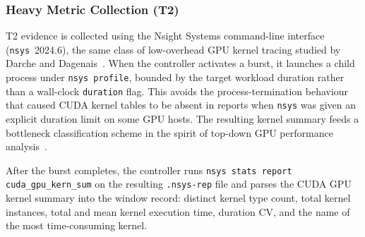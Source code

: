 \subsubsection{Heavy Metric Collection (T2)}

T2 evidence is collected using the Nsight Systems command-line interface (\texttt{nsys}~2024.6), the same class of low-overhead GPU kernel tracing studied by Darche and Dagenais~\cite{darche2024lowoverhead}. When the controller activates a burst, it launches a child process under \texttt{nsys profile}, bounded by the target workload duration rather than a wall-clock \texttt{duration} flag. This avoids the process-termination behaviour that caused CUDA kernel tables to be absent in reports when \texttt{nsys} was given an explicit duration limit on some GPU hosts. The resulting kernel summary feeds a bottleneck classification scheme in the spirit of top-down GPU performance analysis~\cite{zhou2020topdown,hao2023drgpu}.


After the burst completes, the controller runs \texttt{nsys stats report cuda\_gpu\_kern\_sum} on the resulting \texttt{.nsys-rep} file and parses the CUDA GPU kernel summary into the window record: distinct kernel type count, total kernel instances, total and mean kernel execution time, duration CV, and the name of the most time-consuming kernel.




